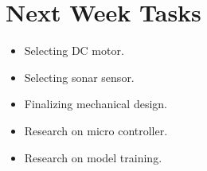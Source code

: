 \section{Next Week Tasks}
\label{sec:nextWeekTasks}
\begin{itemize}
    
\item Selecting DC motor. 
\item Selecting sonar sensor.
\item Finalizing mechanical design.
\item Research on micro controller.
\item Research on model training.
    
\end{itemize}
